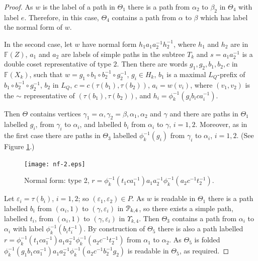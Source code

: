 \documentclass[a4paper,12pt]{article}
\renewcommand{\a}{\alpha }
\renewcommand{\b}{\beta }
\newcommand{\g}{\gamma }
\newcommand{\e}{\varepsilon }
\newcommand{\T}{\Theta }
\renewcommand{\t}{\tau }
\newcommand{\U}{\Upsilon }
\newcommand{\cP}{{\cal{P}}}
\numberwithin{equation}{section}
\numberwithin{figure}{section}
\newcommand{\FF}{\ensuremath{\mathbb{F}}}
\begin{document}
\begin{proof}
As $w$ is the label of a path in $\T_1$ there is a path from $\a_2$ to
$\b_2$ in $\T_4$ with label $e$. Therefore, in this case, $\T_4$ contains
a path from $\a$ to $\b$ which has label the normal form of $w$.



In the second case,
let $w$ have normal form $h_1 a_1 a_2^{-1} h_2^{-1} $, where
$h_1$ and $h_2$ are in $\FF(Z)$,  $a_1$ and $a_2$ are labels
of simple paths in the subtree $T_k$ and $s=a_1a_2^{-1}$ is a double coset
representative of type $2$. Then there are words
$g_1, g_2, b_1, b_2, c$  in $\FF(X_k)$,  such that
$w=g_1\circ b_1 \circ b_2^{-1}\circ g_2^{-1}$,
$g_i\in H_k$, $b_1$ is a maximal $L_Q$-prefix of
$b_1 \circ b_2^{-1}\circ g_2^{-1}$, $b_2$ in
$L_Q$, $c=c(\t(b_1),\t(b_2))$, $a_i=w(v_i)$, where
$(v_1,v_2)$ is the $\sim$ representative of $(\t(b_1),\t(b_2))$, 
and $h_i=\phi_k^{-1}(g_ib_ica_i^{-1})$.

Then $\T$ contains vertices $\g_1=\a,\g_2=\b, \a_1, \a_2$ and $\g$ and there are paths
in $\T_1$ 
labelled $g_i$, from $\g_i$ to $\a_i$, and labelled $b_i$ from $\a_i$ to $\g$,
$i=1,2$. Moreover, as in the first case there are paths in $\T_3$ labelled
$\phi_k^{-1}(g_i)$
from $\g_i$ to $\a_i$, $i=1,2$.
(See Figure \ref{fig:nf-2}.)
\begin{figure}
\begin{center}
\psfrag{a}{$\a=\g_1$}
\psfrag{b}{$\b=\g_2$}
\psfrag{a1}{$\a_1$}
\psfrag{a2}{$\a_2$}
\psfrag{b1}{$\a_2$}
\psfrag{b2}{$\b_2$}
\psfrag{Th5}{$\T_5$}
\psfrag{m}{$\g$}
\texttt{[image: nf-2.eps]}
\end{center}
\caption{Normal form: type 2, $r=\phi_k^{-1}(t_1ca_1^{-1})a_1a_2^{-1}\phi_k^{-1}(a_2c^{-1}t_2^{-1})$.}
\label{fig:nf-2}
\end{figure}
Let $\e_i=\t(b_i)$, $i=1,2$; so $(\e_1,\e_2)\in P$. 
As $w$ is readable in $\T_1$ there is a path labelled 
$b_i$ from $(\a_i,1)$ to $(\g,\e_i)$ in $\cP_{k,4}$, so there
exists a simple path, labelled $t_i$, from $(\a_i,1)$ to $(\g,\e_i)$ in 
$\U_{k,4}$. Then $\T_3$ contains a path from $\a_i$ to $\a_i$ with 
label $\phi_k^{-1}(b_it_i^{-1})$. 
By construction of $\T_5$ there is also a path labelled
$r=\phi_k^{-1}(t_1ca_1^{-1})a_1a_2^{-1}\phi_k^{-1}(a_2c^{-1}t_2^{-1})$
from $\a_1$ to $\a_2$.
 As $\T_5$ is folded
$
\phi_k^{-1}(g_1 b_1ca_1^{-1})a_1a_2^{-1}\phi_k^{-1}(a_2c^{-1}b_2^{-1}g_2)$
 is readable in
$\T_5$, as required.

\end{proof}
\end{document}
